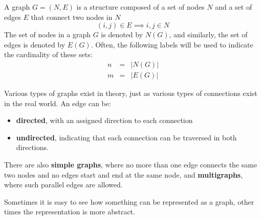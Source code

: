\begin{definition}[Graph]
    A graph $G = (N,E)$ is a structure composed of a set of nodes $N$
    and a set of edges $E$ that connect two nodes in  $N$
    \[(i,j) \in E \implies i,j\in N\]
    The set of nodes in a graph $G$ is denoted by $N(G)$, and similarly, the set of edges is denoted by $E(G)$. Often, the following labels will be used to indicate the cardinality of these sets:
        \[\begin{array}{rcl}
            n &=& |N(G)|\\
            m &=& |E(G)| 
        \end{array}\]    
\end{definition}Various types of graphs exist in theory, just as various types of connections exist in the real world.
An edge can be:
\begin{itemize} 
    \item \textbf{directed}, with an assigned direction to each connection
    \item \textbf{undirected}, indicating that each connection can be traversed in both directions.
\end{itemize} 

There are also \textbf{simple graphs}, where no more than one edge connects the same two nodes and no edges start and end at the same node, and \textbf{multigraphs}, where such parallel edges are allowed.

Sometimes it is easy to see how something can be represented as a graph, other times the representation is more abstract.

